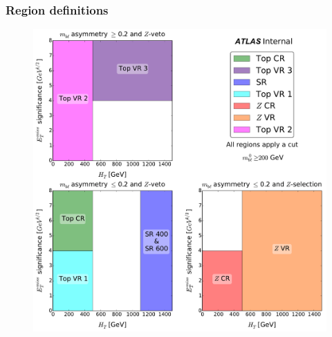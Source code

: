 \documentclass[10pt, svgnames]{beamer}
\begin{document}
\frame
{
  \frametitle{Region definitions}
  \begin{figure}
    \includegraphics[height=0.80\textheight]{figures/regions__met_sig__ht_plane.pdf}
  \end{figure}
}
\end{document}
